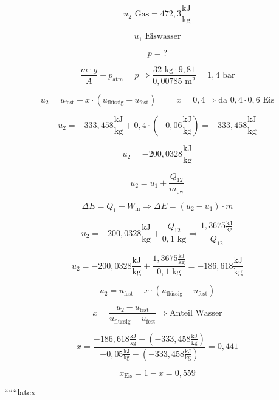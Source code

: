 \[
u_2 \text{ Gas} = 472,3 \frac{\text{kJ}}{\text{kg}}
\]

\[
u_1 \text{ Eiswasser}
\]

\[
p = ?
\]

\[
\frac{m \cdot g}{A} + p_{\text{atm}} = p \Rightarrow \frac{32 \text{ kg} \cdot 9,81}{0,00785 \text{ m}^2} = 1,4 \text{ bar}
\]

\[
u_2 = u_{\text{fest}} + x \cdot (u_{\text{flüssig}} - u_{\text{fest}}) \hspace{1cm} x = 0,4 \Rightarrow \text{da } 0,4 \cdot 0,6 \text{ Eis}
\]

\[
u_2 = -333,458 \frac{\text{kJ}}{\text{kg}} + 0,4 \cdot (-0,06 \frac{\text{kJ}}{\text{kg}}) = -333,458 \frac{\text{kJ}}{\text{kg}}
\]

\[
u_2 = -200,0328 \frac{\text{kJ}}{\text{kg}}
\]

\[
u_2 = u_1 + \frac{Q_{12}}{m_{\text{ew}}}
\]

\[
\Delta E = Q_{1} - W_{\text{in}} \Rightarrow \Delta E = (u_2 - u_1) \cdot m
\]

\[
u_2 = -200,0328 \frac{\text{kJ}}{\text{kg}} + \frac{Q_{12}}{0,1 \text{ kg}} \Rightarrow \frac{1,3675 \frac{\text{kJ}}{\text{kg}}}{Q_{12}}
\]

\[
u_2 = -200,0328 \frac{\text{kJ}}{\text{kg}} + \frac{1,3675 \frac{\text{kJ}}{\text{kg}}}{0,1 \text{ kg}} = -186,618 \frac{\text{kJ}}{\text{kg}}
\]

\[
u_2 = u_{\text{fest}} + x \cdot (u_{\text{flüssig}} - u_{\text{fest}})
\]

\[
x = \frac{u_2 - u_{\text{fest}}}{u_{\text{flüssig}} - u_{\text{fest}}} \Rightarrow \text{Anteil Wasser}
\]

\[
x = \frac{-186,618 \frac{\text{kJ}}{\text{kg}} - (-333,458 \frac{\text{kJ}}{\text{kg}})}{-0,05 \frac{\text{kJ}}{\text{kg}} - (-333,458 \frac{\text{kJ}}{\text{kg}})} = 0,441
\]

\[
x_{\text{Eis}} = 1 - x = 0,559
\]

``````latex